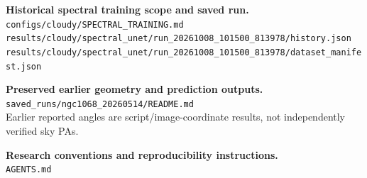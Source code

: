 \documentclass[10pt,letterpaper]{article}
\newcommand{\pathref}[1]{{\small\nolinkurl{#1}}}
\begin{document}
\begin{description}[style=nextline,leftmargin=2.5em,labelwidth=2em,itemsep=8pt]
\item[E8] \textbf{Historical spectral training scope and saved run.}\\
\pathref{configs/cloudy/SPECTRAL_TRAINING.md}\\
\pathref{results/cloudy/spectral_unet/run_20261008_101500_813978/history.json}\\
\pathref{results/cloudy/spectral_unet/run_20261008_101500_813978/dataset_manifest.json}

\item[E9] \textbf{Preserved earlier geometry and prediction outputs.}\\
\pathref{saved_runs/ngc1068_20260514/README.md}\\
Earlier reported angles are script/image-coordinate results, not independently verified sky PAs.

\item[E10] \textbf{Research conventions and reproducibility instructions.}\\
\pathref{AGENTS.md}
\end{description}
\end{document}
